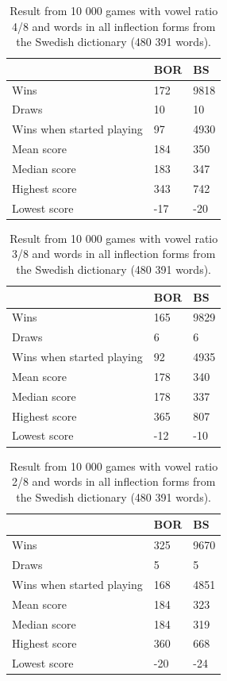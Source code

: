 \documentclass[a4paper, 12pt]{report}
\begin{document}
\begin{table}[h]
\centering
    \begin{tabular}{ l | l | l }
   	& BOR & BS \\
   	\hline
   	Wins & 172 & 9818 \\
	Draws & 10 & 10 \\
	Wins when started playing & 97 & 4930 \\   	
	Mean score & 184 & 350 \\
	Median score & 183 & 347 \\	 	 
	Highest score & 343 & 742 \\
	Lowest score & -17 & -20 \\		
    \end{tabular}
\caption{Result from 10 000 games with vowel ratio 4/8 and words in all inflection forms from the Swedish dictionary (480 391 words).}
\label{tab:borbsstats4}
\end{table}

\begin{table}[h]
\centering
    \begin{tabular}{ l | l | l }
   	& BOR & BS \\
   	\hline
   	Wins & 165 & 9829 \\
	Draws & 6 & 6 \\
	Wins when started playing & 92 & 4935 \\   	
	Mean score & 178 & 340 \\
	Median score & 178 & 337 \\	 	 
	Highest score & 365 & 807 \\
	Lowest score & -12 & -10 \\		
    \end{tabular}
\caption{Result from 10 000 games with vowel ratio 3/8 and words in all inflection forms from the Swedish dictionary (480 391 words).}
\label{tab:borbsstats3}
\end{table}

\begin{table}[h]
\centering
    \begin{tabular}{ l | l | l }
   	& BOR & BS \\
   	\hline
   	Wins & 325 & 9670 \\
	Draws & 5 & 5 \\
	Wins when started playing & 168 & 4851 \\   	
	Mean score & 184 & 323 \\
	Median score & 184 & 319 \\	 	 
	Highest score & 360 & 668 \\
	Lowest score & -20 & -24 \\		
    \end{tabular}
\caption{Result from 10 000 games with vowel ratio 2/8 and words in all inflection forms from the Swedish dictionary (480 391 words).}
\label{tab:borbsstats2}
\end{table}
\end{document}
